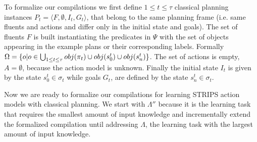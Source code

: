 \documentclass[letterpaper]{article} %
\newcommand{\tup}[1]{{\langle #1 \rangle}}
\begin{document}
To formalize our compilations we first define {\small $1\leq t\leq \tau$} classical planning instances $P_t=\tup{F,\emptyset,I_t,G_t}$, that belong to the same planning frame (i.e. same fluents and actions and differ only in the initial state and goals). The set of fluents $F$ is built instantiating the predicates in $\Psi$ with the set of objects appearing in the example plans or their corresponding labels. Formally $\Omega=\{o|o\in \bigcup_{\small 1\leq t\leq \tau} obj(\pi_t)\cup obj(s_0^t)\cup obj(s_n^t)\}$. The set of actions is empty, $A=\emptyset$, because the action model is unknown. Finally the initial state $I_t$ is given by the state $s_0^t\in \sigma_t$ while goals $G_t$, are defined by the state $s_n^t\in \sigma_t$. 

Now we are ready to formalize our compilations for learning STRIPS action models with classical planning. We start with $\Lambda''$ because it is the learning task that requires the smallest amount of input knowledge and incrementally extend the formalized compilation until addressing $\Lambda$, the learning task with the largest amount of input knowledge.
\end{document}
